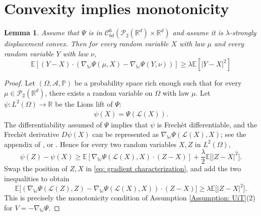 \documentclass[11pt,reqno]{amsart}
\numberwithin{equation}{section}
\newtheorem{lemma}[theorem]{Lemma}
\theoremstyle{definition}
\def\E{{\mathbb E}}
\def\R{{\mathbb R}}
\def\P{{\mathbb P}}
\def\Law{\mathcal{L}}
\newcommand{\wgrad}{\nabla_{\W}}
\newcommand{\W}{\mathbb W}
\begin{document}
\section{Convexity implies monotonicity}
\label{appendix: convexity}
\begin{lemma}
\label{lm: convexity implies monotonicity}
    Assume that $\Psi$ is in $\mathcal C_{bd}^6(\mathcal P_2(\R^d)\times \R^d)$ and assume it is $\lambda$-strongly displacement convex. Then for every random variable $X$ with law $\mu$ and every random variable $Y$ with law $\nu$,
    \begin{equation}
    \label{eq: monotonicity}
       \E[(Y-X)\cdot (\wgrad \Psi(\mu,X)-\wgrad \Psi(Y,\nu))]\geq \lambda \E[|Y-X|^2] 
    \end{equation}
\end{lemma}
\begin{proof}
    Let $(\Omega,\mathcal A,\P)$ be a probability space rich enough such that for every $\mu \in \mathcal P_2(\R^d)$, there exists a random variable on $\Omega$ with law $\mu$. Let $\psi: L^2(\Omega)\to \R$ be the Lions lift of $\Psi$:
    \begin{align*}
        \psi(X)=\Psi(\Law(X)).
    \end{align*}
    The differentiability assumed of $\Psi$ implies that $\psi$ is Frech\`et differentiable, and the Frech\`et derivative $D\psi(X)$ can be represented as $\wgrad \Psi( \Law(X),X)$; see the appendix of \cite{MasterEquation}, or \cite{GangboTudorascu}. Hence for every two random variables $X,Z$ in $L^2(\Omega)$,
    \begin{equation}
    \label{eq: gradient characterization}
        \psi(Z)-\psi(X)\geq \E[\wgrad \Psi( \Law(X),X) \cdot (Z-X)]+\frac \lambda 2 \E\big[|Z-X|^2\big].
    \end{equation}
    Swap the position of $Z,X$ in \eqref{eq: gradient characterization}, and add the two inequalities to obtain
    \begin{equation*}
        \E\big[(\wgrad \Psi(\Law(Z),Z)-\wgrad \Psi(\Law(X),X))\cdot (Z-X)\big] \geq \lambda \E\big[|Z-X|^2\big].
    \end{equation*}
    This is precisely the monotonicity condition of Assumption \ref{Assumption: UiT}(2) for $V=-\wgrad \Psi$.
\end{proof}
\end{document}
